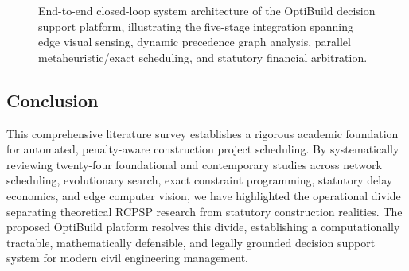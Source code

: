 \documentclass[conference]{IEEEtran}
\begin{document}
\begin{figure}[!t]
\caption{End-to-end closed-loop system architecture of the OptiBuild decision support platform, illustrating the five-stage integration spanning edge visual sensing, dynamic precedence graph analysis, parallel metaheuristic/exact scheduling, and statutory financial arbitration.}
\label{fig:architecture}
\end{figure}

\subsection{Conclusion}
This comprehensive literature survey establishes a rigorous academic foundation for automated, penalty-aware construction project scheduling. By systematically reviewing twenty-four foundational and contemporary studies across network scheduling, evolutionary search, exact constraint programming, statutory delay economics, and edge computer vision, we have highlighted the operational divide separating theoretical RCPSP research from statutory construction realities. The proposed OptiBuild platform resolves this divide, establishing a computationally tractable, mathematically defensible, and legally grounded decision support system for modern civil engineering management.
\end{document}
